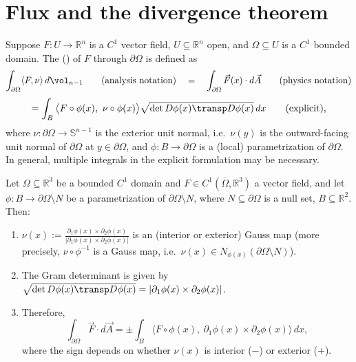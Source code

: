 \section{Flux and the divergence theorem}
\label{sec:flux_divergence_theorem}

\begin{definition}[Flux]
\label{def:flux}
Suppose $F : U \to \mathbb{R}^n$ is a $C^1$ vector field, $U \subseteq \mathbb{R}^n$ open, and
$\Omega \subseteq U$ is a $C^1$ bounded domain. The  () of $F$
through $\partial\Omega$ is defined as
\[\int_{\partial\Omega} \langle F,\nu\rangle\,d\vol_{n-1} \qquad \text{(analysis notation)}
  \quad = \quad \int_{\partial\Omega} \vec F(x)\cdot d\vec A \qquad \text{(physics notation)}\]
\[= \int_B \big\langle F\circ\phi(x),\ \nu\circ\phi(x)\big\rangle
   \sqrt{\det D\phi(x)\transp D\phi(x)}\,dx \qquad \text{(explicit)},\]
where $\nu : \partial\Omega \to \mathbb{S}^{n-1}$ is the exterior unit normal, i.e.\ $\nu(y)$
is the outward-facing unit normal of $\partial\Omega$ at $y \in \partial\Omega$, and
$\phi : B \to \partial\Omega$ is a (local) parametrization of $\partial\Omega$. In general,
multiple integrals in the explicit formulation may be necessary.
\end{definition}

\begin{proposition}
\label{prop:flux_r3}
Let $\Omega \subseteq \mathbb{R}^3$ be a bounded $C^1$ domain and $F \in
C^1(\overline\Omega,\mathbb{R}^3)$ a vector field, and let $\phi : B \to \partial\Omega
\setminus N$ be a parametrization of $\partial\Omega\setminus N$, where $N \subseteq
\partial\Omega$ is a null set, $B \subseteq \mathbb{R}^2$. Then:
\begin{enumerate}[label=\textbf{\arabic*.}]
  \item $\displaystyle\nu(x) := \frac{\partial_1\phi(x)\times\partial_2\phi(x)}
    {\lvert\partial_1\phi(x)\times\partial_2\phi(x)\rvert}$ is an (interior or exterior) Gauss
    map (more precisely, $\nu\circ\phi^{-1}$ is a Gauss map, i.e.\
    $\nu(x) \in N_{\phi(x)}(\partial\Omega\setminus N)$).
  \item The Gram determinant is given by
    $\sqrt{\det D\phi(x)\transp D\phi(x)} = \lvert\partial_1\phi(x)\times\partial_2\phi(x)
    \rvert$.
  \item Therefore,
    \[\int_{\partial\Omega} \vec F\cdot d\vec A = \pm\int_B \big\langle F\circ\phi(x),\
      \partial_1\phi(x)\times\partial_2\phi(x)\big\rangle\,dx,\]
    where the sign depends on whether $\nu(x)$ is interior ($-$) or exterior ($+$).
\end{enumerate}
\end{proposition}

